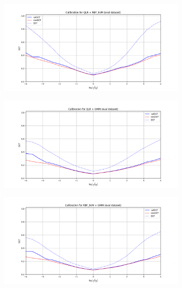 \documentclass[12pt]{report}
\begin{document}
\begin{figure}[H]
    \centering
    \begin{subfigure}[t]{0.49\textwidth}
        \includegraphics[width=\textwidth]{./plot/eval/eval_calib_QLR_RBF_SVM.png}
    \end{subfigure}
    \hfill
    \begin{subfigure}[t]{0.49\textwidth}
        \includegraphics[width=\textwidth]{./plot/eval/eval_calib_QLR_GMM.png}
    \end{subfigure}
    \begin{subfigure}[t]{0.49\textwidth}
        \includegraphics[width=\textwidth]{./plot/eval/eval_calib_RBF_SVM_GMM.png}

\end{subfigure}
\end{figure}
\end{document}

